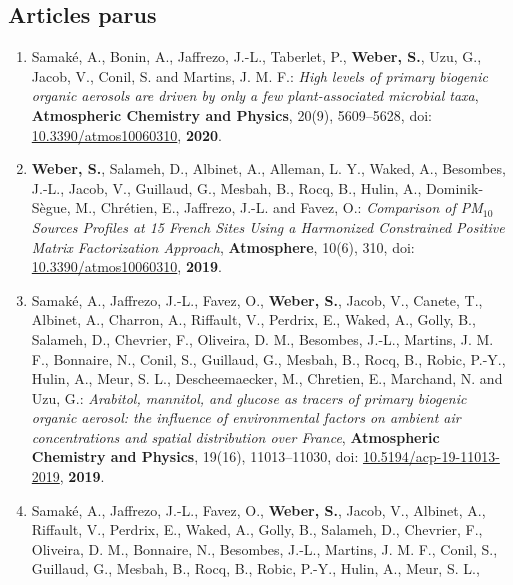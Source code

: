 

\subsection{Articles parus}

\begin{enumerate}
    \item Samaké, A., Bonin, A., Jaffrezo, J.-L., Taberlet, P., \textbf{Weber, S.}, Uzu,
        G., Jacob, V., Conil, S. and Martins, J. M. F.:
        \textit{High levels of primary biogenic organic aerosols are driven by only a few
            plant-associated microbial taxa}, 
        \textbf{Atmospheric Chemistry and Physics}, 20(9), 5609–5628,
        doi: \href{https://doi.org/10.5194/acp-20-5609-2020}{10.3390/atmos10060310},
        \textbf{2020}.
    \item \textbf{Weber, S.}, Salameh, D., Albinet, A., Alleman, L. Y., Waked, A.,
        Besombes, J.-L., Jacob, V., Guillaud, G., Mesbah, B., Rocq, B., Hulin, A.,
        Dominik-Sègue, M., Chrétien, E., Jaffrezo, J.-L. and Favez, O.:
        \textit{Comparison of PM$_{10}$ Sources Profiles at 15 French Sites Using a Harmonized Constrained Positive
        Matrix Factorization Approach}, \textbf{Atmosphere}, 10(6), 310,
        doi: \href{https://doi.org/10.3390/atmos10060310}{10.3390/atmos10060310},
        \textbf{2019}.
    \item Samaké, A., Jaffrezo, J.-L., Favez, O., \textbf{Weber, S.}, Jacob, V., Canete,
        T., Albinet, A., Charron, A., Riffault, V., Perdrix, E., Waked, A., Golly, B.,
        Salameh, D., Chevrier, F., Oliveira, D. M., Besombes, J.-L., Martins, J. M. F.,
        Bonnaire, N., Conil, S., Guillaud, G., Mesbah, B., Rocq, B., Robic, P.-Y., Hulin,
        A., Meur, S. L., Descheemaecker, M., Chretien, E., Marchand, N. and Uzu, G.:
        \textit{Arabitol, mannitol, and glucose as tracers of primary biogenic organic
            aerosol: the influence of environmental factors on ambient air concentrations
            and spatial distribution over France},
        \textbf{Atmospheric Chemistry and Physics}, 19(16), 11013–11030,
        doi: \href{https://doi.org/10.5194/acp-19-11013-2019}{10.5194/acp-19-11013-2019},
        \textbf{2019}.
    \item Samaké, A., Jaffrezo, J.-L., Favez, O., \textbf{Weber, S.}, Jacob, V., Albinet,
        A., Riffault, V., Perdrix, E., Waked, A., Golly, B., Salameh, D., Chevrier, F.,
        Oliveira, D. M., Bonnaire, N., Besombes, J.-L., Martins, J. M.  F., Conil, S.,
        Guillaud, G., Mesbah, B., Rocq, B., Robic, P.-Y., Hulin, A., Meur, S. L.,

\end{enumerate}
